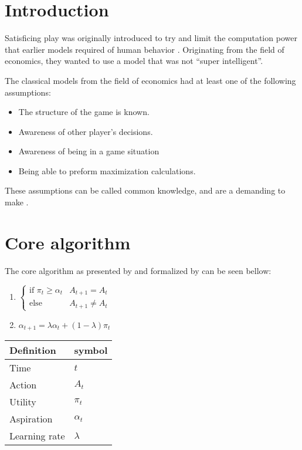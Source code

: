 \section{Introduction}
\toReview
Satisficing play was originally introduced
to try and limit the computation power that earlier models required of human
behavior \citep{herbert}. Originating from the field of economics, they
wanted to use a model that was not ``super intelligent''.

The classical models from the field of economics had at least one of the
following assumptions:
\begin{itemize}
\itemsep0em 
  \item The structure of the game is known.
  \item Awareness of other player's decisions.
  \item Awareness of being in a game situation
  \item Being able to preform maximization calculations.
\end{itemize}

These assumptions can be called common knowledge, and are a demanding to
make \citep{binmore}. 

\section{Core algorithm}
The core algorithm as presented by \citep{herbert} and formalized by
\citep{karandikar} 
can be seen bellow:

\begin{enumerate}
  \item $ \begin{cases}
              \text{if } \pi_t \geq \alpha_t & A_{t+1} = A_t\\
              \text{else} & A_{t+1} \neq A_t
              \end{cases}$
  \item $ \alpha_{t+1} = \lambda \alpha_t + (1-\lambda) \pi_t $ \\
\end{enumerate}
\begin{tabular}{ll}
  Definition & symbol \\ \toprule
  Time & $t$ \\
  Action & $A_t$ \\
  Utility & $\pi_t$ \\
  Aspiration & $\alpha_t$ \\
  Learning rate & $\lambda$ \\ \bottomrule
\end{tabular}


